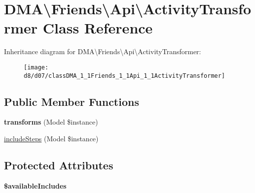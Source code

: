 \hypertarget{classDMA_1_1Friends_1_1Api_1_1ActivityTransformer}{\section{D\-M\-A\textbackslash{}Friends\textbackslash{}Api\textbackslash{}Activity\-Transformer Class Reference}
\label{classDMA_1_1Friends_1_1Api_1_1ActivityTransformer}
}
Inheritance diagram for D\-M\-A\textbackslash{}Friends\textbackslash{}Api\textbackslash{}Activity\-Transformer\-:\begin{figure}[H]
\begin{center}
\leavevmode
\texttt{[image: d8/d07/classDMA\_1\_1Friends\_1\_1Api\_1\_1ActivityTransformer]}
\end{center}
\end{figure}
\subsection*{Public Member Functions}
\begin{DoxyCompactItemize}
\item 
\hypertarget{classDMA_1_1Friends_1_1Api_1_1ActivityTransformer_a7d5e972a572a1448f4d230124d0d747e}{{\bfseries transforms} (Model \$instance)}\label{classDMA_1_1Friends_1_1Api_1_1ActivityTransformer_a7d5e972a572a1448f4d230124d0d747e}

\item 
\hyperlink{classDMA_1_1Friends_1_1Api_1_1ActivityTransformer_ad840be788d75759d0c2eb9874acb9b4a}{include\-Steps} (Model \$instance)
\end{DoxyCompactItemize}
\subsection*{Protected Attributes}
\begin{DoxyCompactItemize}
\item 
{\bfseries \$available\-Includes}
\end{DoxyCompactItemize}


